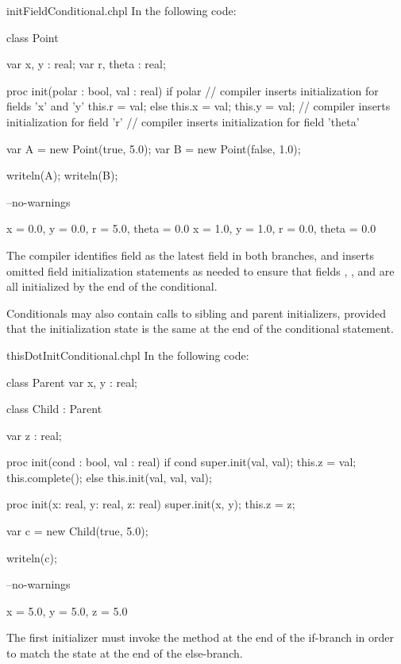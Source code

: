 \begin{chapelexample}{initFieldConditional.chpl}
In the following code:
\begin{chapel}
class Point {
  var x, y : real;
  var r, theta : real;

  proc init(polar : bool, val : real) {
    if polar {
      // compiler inserts initialization for fields 'x' and 'y'
      this.r = val;
    } else {
      this.x = val;
      this.y = val;
      // compiler inserts initialization for field 'r'
    }
    // compiler inserts initialization for field 'theta'
  }
}

var A = new Point(true, 5.0);
var B = new Point(false, 1.0);
\end{chapel}
\begin{chapelpost}
writeln(A);
writeln(B);
\end{chapelpost}
\begin{chapelcompopts}
--no-warnings
\end{chapelcompopts}
\begin{chapeloutput}
{x = 0.0, y = 0.0, r = 5.0, theta = 0.0}
{x = 1.0, y = 1.0, r = 0.0, theta = 0.0}
\end{chapeloutput}

The compiler identifies field  as the latest field in both branches,
and inserts omitted field initialization statements as needed to ensure that
fields , , and  are all initialized by the end of the
conditional.
\end{chapelexample}

Conditionals may also contain calls to sibling and parent initializers,
provided that the initialization state is the same at the end of the
conditional statement.

\begin{chapelexample}{thisDotInitConditional.chpl}
In the following code:
\begin{chapel}
class Parent {
  var x, y : real;
}

class Child : Parent {
  var z : real;

  proc init(cond : bool, val : real) {
    if cond {
      super.init(val, val);
      this.z = val;
      this.complete();
    } else {
      this.init(val, val, val);
    }
  }

  proc init(x: real, y: real, z: real) {
    super.init(x, y);
    this.z = z;
  }
}

var c = new Child(true, 5.0);
\end{chapel}
\begin{chapelpost}
writeln(c);
\end{chapelpost}
\begin{chapelcompopts}
--no-warnings
\end{chapelcompopts}
\begin{chapeloutput}
{x = 5.0, y = 5.0, z = 5.0}
\end{chapeloutput}
The first initializer must invoke the  method at the end of
the if-branch in order to match the state at the end of the else-branch.
\end{chapelexample}

